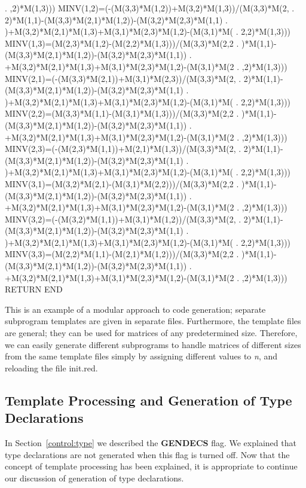 \begin{framedverbatim}
     . ,2)*M(1,3)))
      MINV(1,2)=(-(M(3,3)*M(1,2))+M(3,2)*M(1,3))/(M(3,3)*M(2,
     . 2)*M(1,1)-(M(3,3)*M(2,1)*M(1,2))-(M(3,2)*M(2,3)*M(1,1)
     . )+M(3,2)*M(2,1)*M(1,3)+M(3,1)*M(2,3)*M(1,2)-(M(3,1)*M(
     . 2,2)*M(1,3)))
      MINV(1,3)=(M(2,3)*M(1,2)-(M(2,2)*M(1,3)))/(M(3,3)*M(2,2
     . )*M(1,1)-(M(3,3)*M(2,1)*M(1,2))-(M(3,2)*M(2,3)*M(1,1))
     . +M(3,2)*M(2,1)*M(1,3)+M(3,1)*M(2,3)*M(1,2)-(M(3,1)*M(2
     . ,2)*M(1,3)))
      MINV(2,1)=(-(M(3,3)*M(2,1))+M(3,1)*M(2,3))/(M(3,3)*M(2,
     . 2)*M(1,1)-(M(3,3)*M(2,1)*M(1,2))-(M(3,2)*M(2,3)*M(1,1)
     . )+M(3,2)*M(2,1)*M(1,3)+M(3,1)*M(2,3)*M(1,2)-(M(3,1)*M(
     . 2,2)*M(1,3)))
      MINV(2,2)=(M(3,3)*M(1,1)-(M(3,1)*M(1,3)))/(M(3,3)*M(2,2
     . )*M(1,1)-(M(3,3)*M(2,1)*M(1,2))-(M(3,2)*M(2,3)*M(1,1))
     . +M(3,2)*M(2,1)*M(1,3)+M(3,1)*M(2,3)*M(1,2)-(M(3,1)*M(2
     . ,2)*M(1,3)))
      MINV(2,3)=(-(M(2,3)*M(1,1))+M(2,1)*M(1,3))/(M(3,3)*M(2,
     . 2)*M(1,1)-(M(3,3)*M(2,1)*M(1,2))-(M(3,2)*M(2,3)*M(1,1)
     . )+M(3,2)*M(2,1)*M(1,3)+M(3,1)*M(2,3)*M(1,2)-(M(3,1)*M(
     . 2,2)*M(1,3)))
      MINV(3,1)=(M(3,2)*M(2,1)-(M(3,1)*M(2,2)))/(M(3,3)*M(2,2
     . )*M(1,1)-(M(3,3)*M(2,1)*M(1,2))-(M(3,2)*M(2,3)*M(1,1))
     . +M(3,2)*M(2,1)*M(1,3)+M(3,1)*M(2,3)*M(1,2)-(M(3,1)*M(2
     . ,2)*M(1,3)))
      MINV(3,2)=(-(M(3,2)*M(1,1))+M(3,1)*M(1,2))/(M(3,3)*M(2,
     . 2)*M(1,1)-(M(3,3)*M(2,1)*M(1,2))-(M(3,2)*M(2,3)*M(1,1)
     . )+M(3,2)*M(2,1)*M(1,3)+M(3,1)*M(2,3)*M(1,2)-(M(3,1)*M(
     . 2,2)*M(1,3)))
      MINV(3,3)=(M(2,2)*M(1,1)-(M(2,1)*M(1,2)))/(M(3,3)*M(2,2
     . )*M(1,1)-(M(3,3)*M(2,1)*M(1,2))-(M(3,2)*M(2,3)*M(1,1))
     . +M(3,2)*M(2,1)*M(1,3)+M(3,1)*M(2,3)*M(1,2)-(M(3,1)*M(2
     . ,2)*M(1,3)))
      RETURN                                              
      END                                                 
\end{framedverbatim} 

This is an example of a modular approach to code generation; separate
subprogram templates are given in separate files.  Furthermore, the template
files are general; they can be used for matrices of any predetermined
size.  Therefore, we can easily generate different subprograms to
handle matrices of different sizes from the same template files
simply by assigning different values to {\it n}, and reloading the
file init.red.

\subsection{Template Processing and Generation of Type Declarations}
\label{template:type}
 
In Section~\ref{control:type} we described the {\bf GENDECS} flag.  We
explained that type declarations are not generated when this flag is
turned off.  Now that the concept of template processing has been
explained, it is appropriate to continue our discussion of generation
of type declarations.

